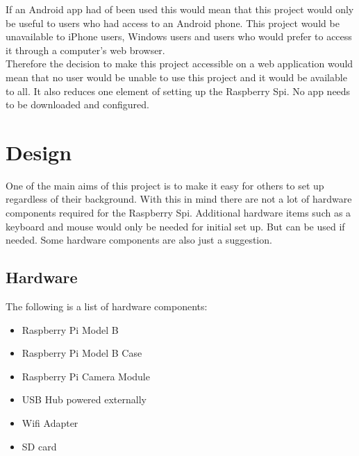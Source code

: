 \documentclass[]{report}
\begin{document}
If an Android app had of been used this would mean that this project would only be useful to users who had access to an Android phone. This project would be unavailable to iPhone users, Windows users and users who would prefer to access it through a computer's web browser.\\

Therefore the decision to make this project accessible on a web application would mean that no user would be unable to use this project and it would be available to all. It also reduces one element of setting up the Raspberry Spi. No app needs to be downloaded and configured.\\

% 
\chapter{Design}
\label{ch:design}
	One of the main aims of this project is to make it easy for others to set up regardless of their background. With this in mind there are not a lot of hardware components required for the Raspberry Spi. Additional hardware items such as a keyboard and mouse would only be needed for initial set up. But can be used if needed. Some hardware components are also just a suggestion. \\
	
\section{Hardware}	
\label{sec:hardware}

The following is a list of hardware components:\\
\begin{itemize}
  \item Raspberry Pi Model B\\
  \item Raspberry Pi Model B Case\\
  \item Raspberry Pi Camera Module\\
  \item USB Hub powered externally\\
  \item Wifi Adapter\\
  \item SD card\\
\end{itemize} 
\end{document}
